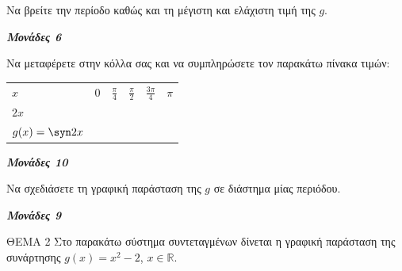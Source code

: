 \documentclass[11pt,a4paper,twoside]{book}
\newcommand{\monades}[1]{
\hspace*{\fill}
\textbf{\textit{\textcolor{maincolor}{Μονάδες #1}}}}
\begin{document}
\begin{alist}
\item Να βρείτε την περίοδο καθώς και τη μέγιστη και ελάχιστη τιμή της $g$.
\monades{6}
\item
\begin{rlist}
\item Να μεταφέρετε στην κόλλα σας και να συμπληρώσετε τον παρακάτω πίνακα τιμών:
\begin{longtable}[]{@{}
  >{\centering\arraybackslash}p{}
  >{\centering\arraybackslash}p{}
  >{\centering\arraybackslash}p{}
  >{\centering\arraybackslash}p{}
  >{\centering\arraybackslash}p{}
  >{\centering\arraybackslash}p{}@{}}
\noalign{}
\begin{minipage}[b]{\linewidth}\centering
$x$
\end{minipage} & \begin{minipage}[b]{\linewidth}\centering
$0$
\end{minipage} & \begin{minipage}[b]{\linewidth}\centering
$\frac{\pi}{4}$
\end{minipage} & \begin{minipage}[b]{\linewidth}\centering
$\frac{\pi}{2}$
\end{minipage} & \begin{minipage}[b]{\linewidth}\centering
$\frac{3\pi}{4}$
\end{minipage} & \begin{minipage}[b]{\linewidth}\centering
$\pi$
\end{minipage} \\
\noalign{}
\noalign{}
\endlastfoot
$2x$ & & & & & \\
$g(x) = \syn  2x$ & & & & & \\
\end{longtable}
\monades{10}
\item Να σχεδιάσετε τη γραφική παράσταση της $g$ σε διάστημα μίας περιόδου.
\monades{9}
\end{rlist}
\end{alist}
ΘEMA 2
Στο παρακάτω σύστημα συντεταγμένων δίνεται η γραφική παράσταση της συνάρτησης $g(x) = x^2 - 2$, $x \in \mathbb{R}$.
\begin{center}
\end{center}
\end{document}
